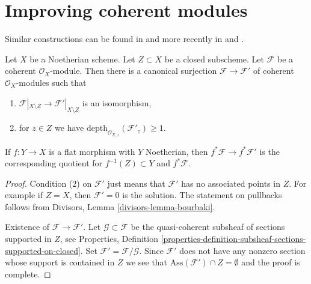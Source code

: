 \section{Improving coherent modules}
\label{section-improve}

\noindent
Similar constructions can be found in \cite{EGA} and more recently in
\cite{Kollar-local-global-hulls} and \cite{Kollar-variants}.

\begin{lemma}
\label{lemma-get-depth-1-along-Z}
Let $X$ be a Noetherian scheme. Let $Z \subset X$ be a closed subscheme.
Let $\mathcal{F}$ be a coherent $\mathcal{O}_X$-module.
Then there is a canonical surjection $\mathcal{F} \to \mathcal{F}'$
of coherent $\mathcal{O}_X$-modules such that
\begin{enumerate}
\item $\mathcal{F}|_{X \setminus Z} \to \mathcal{F}'|_{X \setminus Z}$
is an isomorphism,
\item for $z \in Z$ we have
$\text{depth}_{\mathcal{O}_{X, z}}(\mathcal{F}'_z) \geq 1$.
\end{enumerate}
If $f : Y \to X$ is a flat morphism with $Y$ Noetherian, then
$f^*\mathcal{F} \to f^*\mathcal{F}'$ is the corresponding
quotient for $f^{-1}(Z) \subset Y$ and $f^*\mathcal{F}$.
\end{lemma}

\begin{proof}
Condition (2) on $\mathcal{F}'$ just means that $\mathcal{F}'$
has no associated points in $Z$. For example if
$Z = X$, then $\mathcal{F}' = 0$ is the solution.
The statement on pullbacks follows from
Divisors, Lemma \ref{divisors-lemma-bourbaki}.

\medskip\noindent
Existence of $\mathcal{F} \to \mathcal{F}'$.
Let $\mathcal{G} \subset \mathcal{F}$
be the quasi-coherent subsheaf of sections supported in $Z$, see
Properties, Definition
\ref{properties-definition-subsheaf-sections-supported-on-closed}.
Set $\mathcal{F}' = \mathcal{F}/\mathcal{G}$.
Since $\mathcal{F}'$ does not have any nonzero section
whose support is contained in $Z$ we see that
$\text{Ass}(\mathcal{F}') \cap Z = \emptyset$
and the proof is complete.
\end{proof}

